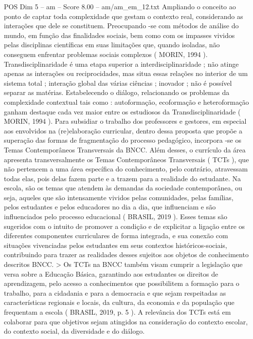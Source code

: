 \begin{textsample}{POS Dim 5 – am – Score 8.00 – am/am\_em\_12.txt}
Ampliando o conceito ao ponto de captar toda complexidade que gestam o contexto real, considerando as interações que dele se constituem.
Preocupando -se com métodos de análise do mundo, em função das finalidades sociais, bem como com os impasses vividos pelas disciplinas científicas em suas limitações que, quando isoladas, não conseguem enfrentar problemas sociais complexos ( MORIN, 1994 ).
Transdisciplinaridade é uma etapa superior a interdisciplinaridade ; não atinge apenas as interações ou reciprocidades, mas situa essas relações no interior de um sistema total ; interação global das várias ciências ; inovador ; não é possível separar as matérias.
Estabelecendo o diálogo, relacionando os problemas da complexidade contextual tais como : autoformação, ecoformação e heteroformação ganham destaque cada vez maior entre os estudiosos da Transdisciplinaridade ( MORIN, 1994 ).
Para subsidiar o trabalho dos professores e gestores, em especial aos envolvidos na (re)elaboração curricular, dentro dessa proposta que propõe a superação das formas de fragmentação do processo pedagógico, incorpora -se os Temas Contemporâneos Transversais da BNCC.
Além desses, o currículo da área apresenta transversalmente os Temas Contemporâneos Transversais ( TCTs ), que não pertencem a uma área específica do conhecimento, pelo contrário, atravessam todas elas, pois delas fazem parte e a trazem para a realidade do estudante.
Na escola, são os temas que atendem às demandas da sociedade contemporânea, ou seja, aqueles que são intensamente vividos pelas comunidades, pelas famílias, pelos estudantes e pelos educadores no dia a dia, que influenciam e são influenciados pelo processo educacional ( BRASIL, 2019 ).
Esses temas são sugeridos com o intuito de promover a condição e de explicitar a ligação entre os diferentes componentes curriculares de forma integrada, e sua conexão com situações vivenciadas pelos estudantes em seus contextos históricos-sociais, contribuindo para trazer as realidades desses sujeitos aos objetos de conhecimento descritos BNCC. > Os TCTs na BNCC também visam cumprir a legislação que versa sobre a Educação Básica, garantindo aos estudantes os direitos de aprendizagem, pelo acesso a conhecimentos que possibilitem a formação para o trabalho, para a cidadania e para a democracia e que sejam respeitadas as características regionais e locais, da cultura, da economia e da população que frequentam a escola ( BRASIL, 2019, p. 5 ).
A relevância dos TCTs está em colaborar para que objetivos sejam atingidos na consideração do contexto escolar, do contexto social, da diversidade e do diálogo.

\end{textsample}
